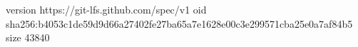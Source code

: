version https://git-lfs.github.com/spec/v1
oid sha256:b4053c1de59d9d66a27402fe27ba65a7e1628e00c3e299571cba25e0a7af84b5
size 43840
